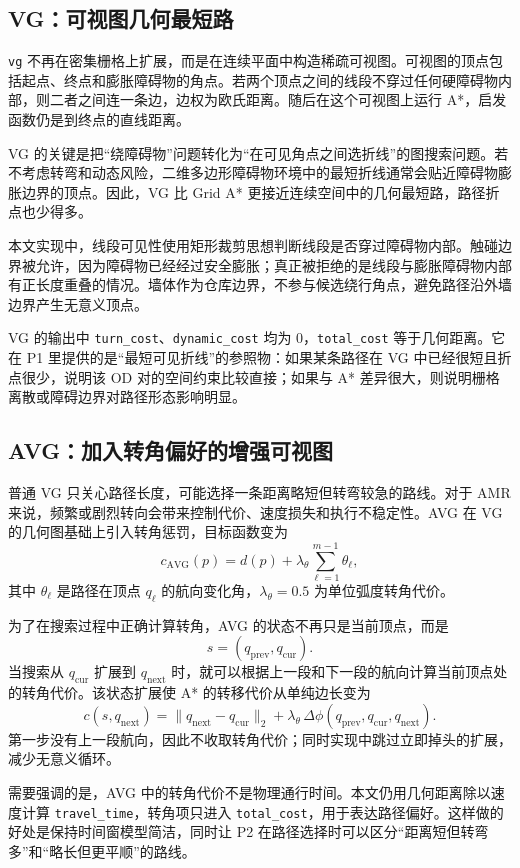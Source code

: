 \subsection{VG：可视图几何最短路}

\verb|vg| 不再在密集栅格上扩展，而是在连续平面中构造稀疏可视图。可视图的顶点包括起点、终点和膨胀障碍物的角点。若两个顶点之间的线段不穿过任何硬障碍物内部，则二者之间连一条边，边权为欧氏距离。随后在这个可视图上运行 A*，启发函数仍是到终点的直线距离。

VG 的关键是把“绕障碍物”问题转化为“在可见角点之间选折线”的图搜索问题。若不考虑转弯和动态风险，二维多边形障碍物环境中的最短折线通常会贴近障碍物膨胀边界的顶点。因此，VG 比 Grid A* 更接近连续空间中的几何最短路，路径折点也少得多。

本文实现中，线段可见性使用矩形裁剪思想判断线段是否穿过障碍物内部。触碰边界被允许，因为障碍物已经经过安全膨胀；真正被拒绝的是线段与膨胀障碍物内部有正长度重叠的情况。墙体作为仓库边界，不参与候选绕行角点，避免路径沿外墙边界产生无意义顶点。

VG 的输出中 \verb|turn_cost|、\verb|dynamic_cost| 均为 0，\verb|total_cost| 等于几何距离。它在 P1 里提供的是“最短可见折线”的参照物：如果某条路径在 VG 中已经很短且折点很少，说明该 OD 对的空间约束比较直接；如果与 A* 差异很大，则说明栅格离散或障碍边界对路径形态影响明显。

\subsection{AVG：加入转角偏好的增强可视图}

普通 VG 只关心路径长度，可能选择一条距离略短但转弯较急的路线。对于 AMR 来说，频繁或剧烈转向会带来控制代价、速度损失和执行不稳定性。AVG 在 VG 的几何图基础上引入转角惩罚，目标函数变为
\[
  c_{\mathrm{AVG}}(p)=d(p)+\lambda_\theta\sum_{\ell=1}^{m-1}\theta_\ell,
\]
其中 $\theta_\ell$ 是路径在顶点 $q_\ell$ 的航向变化角，$\lambda_\theta=0.5$ 为单位弧度转角代价。

为了在搜索过程中正确计算转角，AVG 的状态不再只是当前顶点，而是
\[
  s=(q_{\mathrm{prev}},q_{\mathrm{cur}}).
\]
当搜索从 $q_{\mathrm{cur}}$ 扩展到 $q_{\mathrm{next}}$ 时，就可以根据上一段和下一段的航向计算当前顶点处的转角代价。该状态扩展使 A* 的转移代价从单纯边长变为
\[
  c(s,q_{\mathrm{next}})=\|q_{\mathrm{next}}-q_{\mathrm{cur}}\|_2
  +\lambda_\theta\,\Delta\phi(q_{\mathrm{prev}},q_{\mathrm{cur}},q_{\mathrm{next}}).
\]
第一步没有上一段航向，因此不收取转角代价；同时实现中跳过立即掉头的扩展，减少无意义循环。

需要强调的是，AVG 中的转角代价不是物理通行时间。本文仍用几何距离除以速度计算 \verb|travel_time|，转角项只进入 \verb|total_cost|，用于表达路径偏好。这样做的好处是保持时间窗模型简洁，同时让 P2 在路径选择时可以区分“距离短但转弯多”和“略长但更平顺”的路线。

